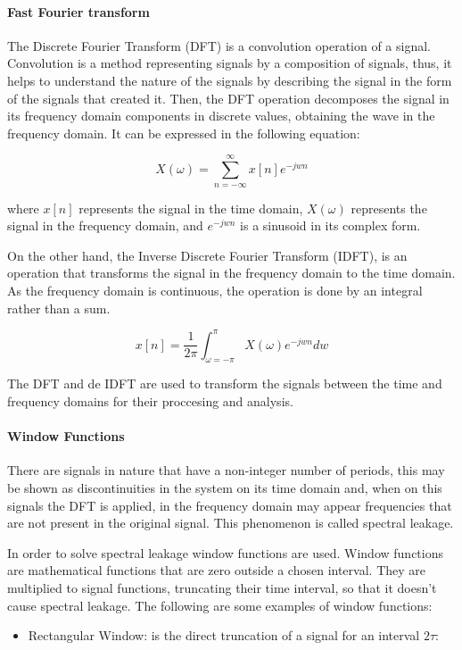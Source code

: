 {{{{{\paragraph{Fast Fourier transform}

The Discrete Fourier Transform (DFT) is a convolution operation of a signal. Convolution is a method representing signals by a composition of signals, thus, it helps to understand the nature of the signals by describing the signal in the form of the signals that created it. Then, the DFT operation decomposes the signal in its frequency domain components in discrete values, obtaining the wave in the frequency domain. It can be expressed in the following equation:

$$X(\omega) = \sum_{n = - \infty}^{\infty} x[n]e^{-jwn}$$

where $x[n]$ represents the signal in the time domain, $X(\omega)$ represents the signal in the frequency domain, and $e^{-jwn}$ is a sinusoid in its complex form.

On the other hand, the Inverse Discrete Fourier Transform (IDFT), is an operation that transforms the signal in the frequency domain to the time domain. As the frequency domain is continuous, the operation is done by an integral rather than a sum.

$$ x[n]= \frac{1}{2\pi}\int_{\omega = - \pi}^{\pi} X(\omega)e^{-jwn} dw$$

The DFT and de IDFT are used to transform the signals between the time and frequency domains for their proccesing and analysis.

\paragraph{Window Functions}
 There are signals in nature that have a non-integer number of periods, this may be shown as discontinuities in the system on its time domain and, when on this signals the DFT is applied, in the frequency domain may appear frequencies that are not present in the original signal. This phenomenon is called spectral leakage. 

 In order to solve spectral leakage window functions are used. Window functions are mathematical functions that are zero outside a chosen interval. They are multiplied to signal functions, truncating their time interval, so that it doesn't cause spectral leakage.  The following are some examples of window functions:
\begin{itemize}
    \item Rectangular Window: is the direct truncation of a signal for an interval $2\tau$:


\end{itemize}}}}}}
